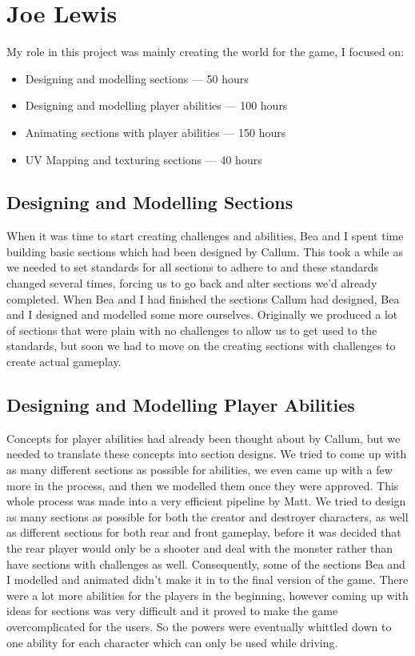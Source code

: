 \documentclass[a4paper,oneside]{memoir}
\begin{document}
		\section{Joe Lewis}
				My role in this project was mainly creating the world for the game, I focused on:

			\begin{itemize}
				\item Designing and modelling sections --- 50 hours
				\item Designing and modelling player abilities --- 100 hours
				\item Animating sections with player abilities --- 150 hours
				\item UV Mapping and texturing sections --- 40 hours
			\end{itemize}

			\subsection{Designing and Modelling Sections}

				When it was time to start creating challenges and abilities, Bea and I spent time building basic sections which had been designed by Callum. This took a while as we needed to set standards for all sections to adhere to and these standards changed several times, forcing us to go back and alter sections we'd already completed. When Bea and I had finished the sections Callum had designed, Bea and I designed and modelled some more ourselves. Originally we produced a lot of sections that were plain with no challenges to allow us to get used to the standards, but soon we had to move on the creating sections with challenges to create actual gameplay. 

			\subsection{Designing and Modelling Player Abilities}

				Concepts for player abilities had already been thought about by Callum, but we needed to translate these concepts into section designs. We tried to come up with as many different sections as possible for abilities, we even came up with a few more in the process, and then we modelled them once they were approved. This whole process was made into a very efficient pipeline by Matt.
				We tried to design as many sections as possible for both the creator and destroyer characters, as well as different sections for both rear and front gameplay, before it was decided that the rear player would only be a shooter and deal with the monster rather than have sections with challenges as well. Consequently, some of the sections Bea and I modelled and animated didn't make it in to the final version of the game. There were a lot more abilities for the players in the beginning, however coming up with ideas for sections was very difficult and it proved to make the game overcomplicated for the users. So the powers were eventually whittled down to one ability for each character which can only be used while driving.
\end{document}
